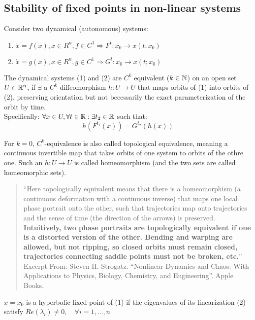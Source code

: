  \subsection{Stability of fixed points in non-linear systems}
 Consider two dynamical (autonomous) systems:
 \begin{enumerate}
     \item $\dot{x}=f(x), x\in R^n, f \in C^1 \Rightarrow F^t: x_0 \to x(t;x_0)$
    \item $\dot{x}=g(x), x\in R^n, g \in C^1 \Rightarrow G^t: x_0 \to x(t;x_0)$
 \end{enumerate}
 
 \begin{definition}
 The dynamical systems (1) and (2) are $C^k$ equivalent ($k\in\mathbb{N}$) on an open set $U\in\mathbb{R}^n$, if $\exists$ a $C^k$-diffeomorphism $h: U\to U$ that maps orbits of (1) into orbits of (2), preserving orientation but not becessarily the exact parameterization of the orbit by time.\\
 Specifically: $\forall x\in U, \forall t \in \mathbb{R}: \exists t_2 \in\mathbb{R}$ such that:
 $$h(F^{t_1}(x))=G^{t_2}(h(x))$$
 \end{definition}
 
 \begin{definition}
 For $k=0$, $C^k$-equivalence is also called topological equivalence, meaning a continuous invertible map that takes orbits of one system to orbits of the othre one. Such an $h: U\to U$ is called homeomorphism (and the two sets are called homeomorphic sets).
 \end{definition}
 
 \begin{quote}
     “Here topologically equivalent means that there is a homeomorphism (a continuous deformation with a continuous inverse) that maps one local phase portrait onto the other, such that trajectories map onto trajectories and the sense of time (the direction of the arrows) is preserved.
    \textbf{Intuitively, two phase portraits are topologically equivalent if one is a distorted version of the other. Bending and warping are allowed, but not ripping, so closed orbits must remain closed, trajectories connecting saddle points must not be broken, etc.}”
Excerpt From: Steven H. Strogatz. “Nonlinear Dynamics and Chaos: With Applications to Physics, Biology, Chemistry, and Engineering”. Apple Books. 
 \end{quote}
 
 \begin{definition}
 $x=x_0$ is a hyperbolic fixed point of (1) if the eigenvalues of its linearization (2) satisfy $Re(\lambda_i)\neq0, \quad \forall i=1,...,n$
 \end{definition}
 

